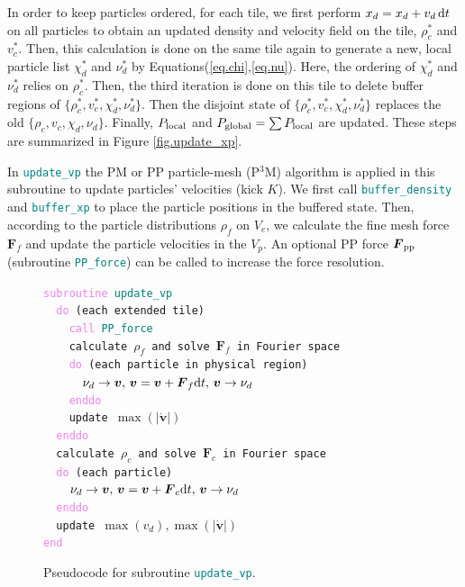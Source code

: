 \documentclass[10pt,twocolumn,reprint]{emulateapj}
\newcommand{\bs}{\boldsymbol}
\newcommand{\tcv}{\textcolor{violet}}
\newcommand{\tcx}{\textcolor{teal}}
\begin{document}
In order to keep particles ordered, for each tile, we first perform $x_d=x_d+v_d\,{\rm d}t$ on all particles to obtain an updated density and velocity field on the tile,  $\rho_c^*$ and $v_c^*$. Then, this calculation is done on the same tile again to generate a new, local particle list $\chi_d^*$ and $\nu_d^*$ by Equations(\ref{eq.chi},\ref{eq.nu}). Here, the ordering of  $\chi_d^*$ and $\nu_d^*$ relies on  $\rho_c^*$. Then, the third iteration is done on this tile to delete buffer regions of  $\{\rho_c^*,v_c^*,\chi_d^*,\nu_d^*\}$.  Then the disjoint state of $\{\rho_c^*,v_c^*,\chi_d^*,\nu_d^*\}$ replaces the old $\{\rho_c,v_c,\chi_d,\nu_d\}$. Finally, $P_{\rm local}$ and $P_{\rm global}=\sum P_{\rm local}$ are updated. These steps are summarized in Figure \ref{fig.update_xp}.

In {\tt \tcx{update\_vp}}
the PM or PP particle-mesh (P$^3$M) algorithm is applied in this subroutine to update particles' velocities (kick $K$).
We first call {\tt \tcx{buffer\_density}} and {\tt \tcx{buffer\_xp}} to place the particle positions in the buffered state. Then, according to the particle distributions $\rho_f$ on $V_e$, we calculate the fine mesh force ${\bs F}_f$ and update the particle velocities in the $V_p$. An optional PP force ${\bs F}_{\rm pp}$ (subroutine {\tt \tcx{PP\_force}}) can be called to increase the force resolution.

\begin{figure}[t]
{\tt \tcv{subroutine} \tcx{update\_vp}\\
\indent \ \ \tcv{do} (each extended tile)\\
\indent \ \ \ \ \tcv{call} \tcx{PP\_force}\\
\indent \ \ \ \ calculate $\rho_f$ and solve ${\bs F}_f$ in Fourier space\\
\indent \ \ \ \ \tcv{do} (each particle in physical region)\\
\indent \ \ \ \ \ \ $\nu_d\rightarrow{\bs v},\,{\bs v}={\bs v}+{\bs F}_f{\rm d}t,\, {\bs v}\rightarrow\nu_d$\\
\indent \ \ \ \ \tcv{enddo}\\
\indent \ \ \ \ update $\max(|{\dot{\bs v}}|)$\\
\indent \ \ \tcv{enddo}\\
\indent \ \ calculate $\rho_c$ and solve ${\bs F}_c$ in Fourier space\\
\indent \ \ \tcv{do} (each particle)\\
\indent \ \ \ \ $\nu_d\rightarrow{\bs v},\,{\bs v}={\bs v}+{\bs F}_c{\rm d}t,\, {\bs v}\rightarrow\nu_d$\\
\indent \ \ \tcv{enddo}\\
\indent \ \ update $\max(v_d),\max(|{\dot{\bs v}}|)$\\
\tcv{end}\\}
\caption{Pseudocode for subroutine {\tt \tcx{update\_vp}}.}
\label{fig.update_vp}
\end{figure}
\end{document}
